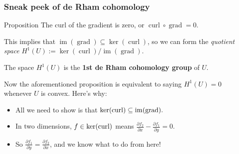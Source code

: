 \documentclass[xcolor=dvipsnames]{beamer}
\begin{document}
    \begin{frame}
        \frametitle{Sneak peek of de Rham cohomology} 
        \begin{block}{Proposition} 
           The curl of the gradient is zero, or $\operatorname{curl}\circ \operatorname{grad}=0$. 
        \end{block}\pause
        This implies that $\operatorname{im}(\operatorname{grad}) \subseteq \ker (\operatorname{curl})$, so we can form the \emph{quotient space} $H^1(U):= \ker (\operatorname{curl})/ \operatorname{im}(\operatorname{grad})$. 
       \begin{definition}
            The space $H^1(U)$ is the \textbf{1st de Rham cohomology group} of $U$.        
        \end{definition}
        Now the aforementioned proposition is equivalent to saying $H^1(U)=0$ whenever $U$ is convex. Here's why:
        \begin{itemize}
            \item<2->All we need to show is that $\ker(\operatorname{curl}) \subseteq \operatorname{im}(\operatorname{grad}).$
            \item<3->In two dimensions, $f \in \ker(\operatorname{curl})$ means $ \frac{\partial f_2}{ \partial x}-\frac{\partial f_1}{\partial y}=0$.
            \item<4->So $\frac{\partial f_1}{\partial y}= \frac{\partial f_2}{\partial x}$, and we know what to do from here!
        \end{itemize}
    \end{frame}
\end{document}
